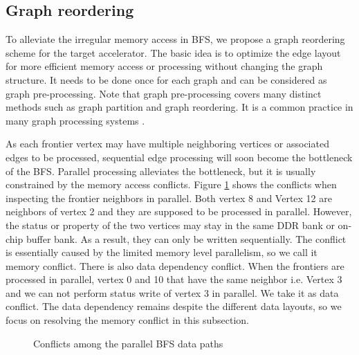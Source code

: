 
\subsection{Graph reordering}

To alleviate the irregular memory access in BFS, 
we propose a graph reordering scheme for the target accelerator. 
The basic idea is to optimize the edge layout for more efficient 
memory access or processing without changing the graph structure.
It needs to be done once for each graph and can be considered 
as graph pre-processing. Note that graph pre-processing covers 
many distinct methods such as graph partition and graph reordering. 
It is a common practice in many graph processing systems \cite{Dai2017foregraph}
\cite{ham2016graphicionado} \cite{gui2019survey} \cite{shi2018graph}.


As each frontier vertex may have multiple neighboring 
vertices or associated edges to be processed, sequential edge processing 
will soon become the bottleneck of the BFS. Parallel processing alleviates the bottleneck, 
but it is usually constrained by the memory access conflicts. Figure \ref{fig:write-conflict} 
shows the conflicts when inspecting the frontier neighbors in parallel.  
Both vertex 8 and Vertex 12 are neighbors of vertex 2 and they are supposed to be 
processed in parallel. However, the status or property of 
the two vertices may stay in the same DDR bank or on-chip buffer bank. As a result, 
they can only be written sequentially. The conflict is essentially caused by the 
limited memory level parallelism, so we call it memory conflict. 
There is also data dependency conflict. When the frontiers are processed in parallel, 
vertex 0 and 10 that have the same neighbor i.e. Vertex 3 and we can not perform status 
write of vertex 3 in parallel. We take it as data conflict. 
The data dependency remains despite the different data layouts, 
so we focus on resolving the memory conflict in this subsection.   

\begin{figure}
    \caption{Conflicts among the parallel BFS data paths}
\label{fig:write-conflict}
\vspace{-0.5em}
\end{figure}

